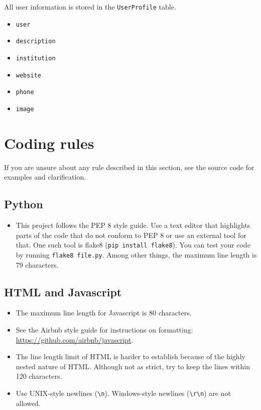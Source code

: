 \documentclass{article}
\begin{document}
All user information is stored in the \texttt{UserProfile} table.
\begin{tcolorbox}[colback=green!5,colframe=green!40!black,title=UserProfile]
  \begin{itemize}
  \item \texttt{user}
  \item \texttt{description}
  \item \texttt{institution}
  \item \texttt{website}
  \item \texttt{phone}
  \item \texttt{image}
  \end{itemize}
\end{tcolorbox}

\section{Coding rules}

If you are unsure about any rule described in this section, see the source code for examples and clarification.

\subsection{Python}

\begin{itemize}
\item This project follows the PEP 8 style guide. Use a text editor that highlights parts of the code that do not conform to PEP 8 or use an external tool for that. One such tool is flake8 (\texttt{pip install flake8}). You can test your code by running \texttt{flake8 file.py}. Among other things, the maximum line length is 79 characters.
\end{itemize}

\subsection{HTML and Javascript}

\begin{itemize}
\item The maximum line length for Javascript is 80 characters.
\item See the Airbnb style guide for instructions on formatting:\\ \url{https://github.com/airbnb/javascript}.
\item The line length limit of HTML is harder to establish because of the highly nested nature of HTML. Although not as strict, try to keep the lines within 120 characters.
\item Use UNIX-style newlines (\verb+\n+). Windows-style newlines (\verb+\r\n+) are not allowed.
\end{itemize}
\end{document}
